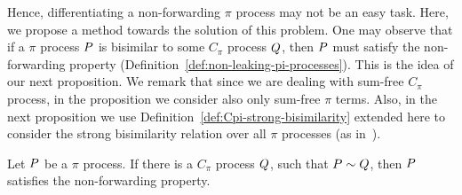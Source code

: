 Hence, differentiating a non-forwarding $\pi$ process may not be an easy task. 
Here, we propose a method towards the solution of this problem. One may observe that if a $\pi$ process $P$ is bisimilar to some $C_\pi$ process $Q$, then $P$ must satisfy the non-forwarding property (Definition~\ref{def:non-leaking-pi-processes}).
This is the idea of our next proposition. 
We remark that since we are dealing with sum-free $C_\pi$ process, in the proposition we consider also only sum-free $\pi$ terms. Also, in the next proposition we use Definition~\ref{def:Cpi-strong-bisimilarity} extended here to consider the strong bisimilarity relation over all $\pi$ processes (as in~\cite{pi_calculus}).


\begin{proposition}\label{prop:non-forwarding-of-pi-processes}
Let $P$ be a %
$\pi$ process. If there is a $C_\pi$ process $Q$, such that $P\sim Q$, then $P$ satisfies the non-forwarding %
property.

\end{proposition}

